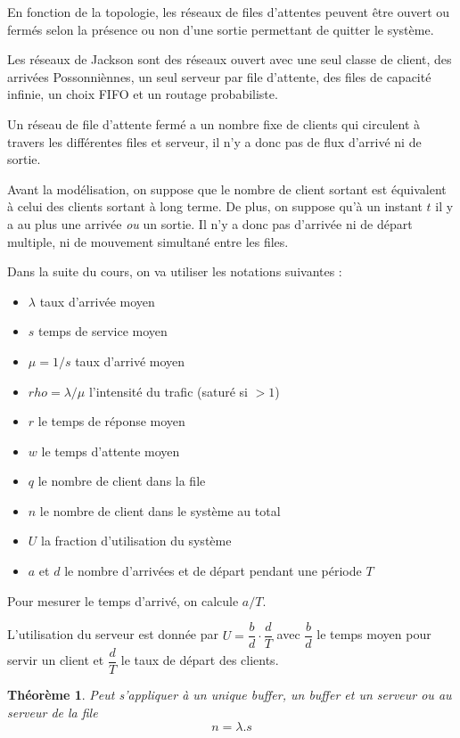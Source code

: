 \documentclass{article}
\newtheorem{thm}{Théorème}
\begin{document}
En fonction de la topologie, les réseaux de files d'attentes peuvent être ouvert ou fermés selon la présence ou non d'une sortie permettant de quitter le système.
\medskip 

Les réseaux de Jackson sont des réseaux ouvert avec une seul classe de client, des arrivées Possonniènnes, un seul serveur par file d'attente, des files de capacité infinie, un choix FIFO et un routage probabiliste.
\medskip

Un réseau de file d'attente fermé a un nombre fixe de clients qui circulent à travers les différentes files et serveur, il n'y a donc pas de flux d'arrivé ni de sortie.

Avant la modélisation, on suppose que le nombre de client sortant est équivalent à celui des clients sortant à long terme. De plus, on suppose qu'à un instant $t$ il y a au plus une arrivée \emph{ou} un sortie. Il n'y a donc pas d'arrivée ni de départ multiple, ni de mouvement simultané entre les files.

Dans la suite du cours, on va utiliser les notations suivantes :
\begin{itemize}
\item $\lambda$ taux d'arrivée moyen
\item $s$ temps de service moyen
\item $\mu = 1/s$ taux d'arrivé moyen
\item $rho = \lambda/\mu$ l'intensité du trafic (saturé si $>1$)
\item $r$ le temps de réponse moyen
\item $w$ le temps d'attente moyen
\item $q$ le nombre de client dans la file
\item $n$ le nombre de client dans le système au total
\item $U$ la fraction d'utilisation du système
\item $a$ et $d$ le nombre d'arrivées et de départ pendant une période $T$
\end{itemize}

Pour mesurer le temps d'arrivé, on calcule $a/T$.

L'utilisation du serveur est donnée par $U = \dfrac{b}{d}\cdot \dfrac{d}{T}$ avec $\dfrac{b}{d}$ le temps moyen pour servir un client et $\dfrac{d}{T}$ le taux de départ des clients.


\begin{thm}
Peut s'appliquer à un unique buffer, un buffer et un serveur ou au serveur de la file
\[n  = \lambda . s\]
\end{thm}
\end{document}
